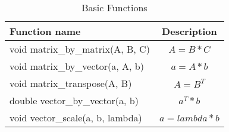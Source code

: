 \begin{table}[htbf]
\begin{center} 
\begin{tabular}{|l | c | } \hline \hline 
Function name & Description \\ \hline
void matrix\_by\_matrix(A, B, C) & $A = B * C$ \\
void matrix\_by\_vector(a, A, b) & $a = A * b$ \\
void matrix\_transpose(A, B) & $A = B^T$ \\
double vector\_by\_vector(a, b) & $a^T * b$ \\
void vector\_scale(a, b, lambda) & $a = lambda * b$ \\ \hline
\end{tabular} 
\end{center} 
\caption{Basic Functions}
\label{tab:func} 
 \end{table}